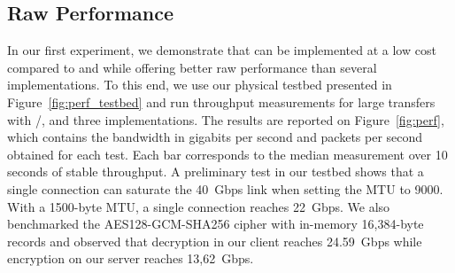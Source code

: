 



\subsection{Raw Performance} \label{sec:perf}
In our first experiment, we demonstrate that \tcpls can be implemented at a low 
cost compared to \tcp and \tls while offering better raw performance than 
several \quic implementations. To this end, we use our physical testbed 
presented in Figure~\ref{fig:perf_testbed} and run throughput measurements for 
large transfers with \tcp/\tls, \tcpls and three \quic implementations.
The results are reported on Figure~\ref{fig:perf}, which contains the bandwidth 
in gigabits per second and packets per second obtained for each test.
Each bar corresponds to the median measurement over 10 seconds of stable 
throughput.
A preliminary test in our testbed shows that a single \tcp connection can 
saturate the 40~Gbps link when setting the MTU to 9000. With a 1500-byte MTU, a 
single \tcp connection reaches 22~Gbps. We also benchmarked the 
AES128-GCM-SHA256 cipher with in-memory 16,384-byte \tls records and observed 
that decryption in our client reaches 24.59~Gbps while encryption on our 
server reaches 13,62~Gbps.


